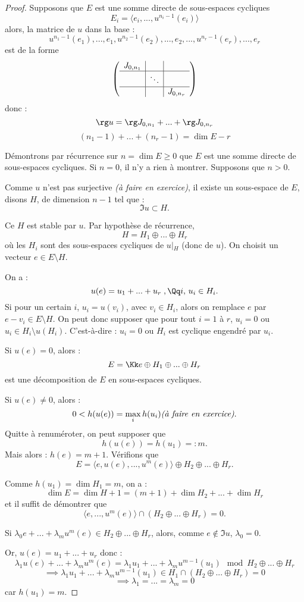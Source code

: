 \documentclass[class=report,crop=false]{standalone}
\newcommand{\exoo}{\emph{(à faire en exercice)}}
\newcommand{\Res}[1]{{\left | {}_{#1} \right.}}
\begin{document}
\begin{proof}
Supposons que $E$ est une somme directe de sous-espaces cycliques 
\[E_i = \langle e_i,...,u^{n_i-1}(e_i)\rangle\]
alors, la matrice de $u$ dans la base :
\[u^{n_1-1}(e_1),...,e_1,u^{n_2-1}(e_2),...,e_2,...,u^{n_r-1}(e_r),...,e_r\]
est de la forme 
\[\left(\begin{array}{c|c|c}
J_{0,n_1}&&\\\hline
&\ddots&\\\hline
&&J_{0,n_r}
\end{array}\right)\]
donc :
\[\rg u = \rg J_{0,n_1} + ... + \rg J_{0,n_r} \]
\[ (n_1 -1) + ... + (n_r -1) = \dim E -r
\]

Démontrons par récurrence sur $n = \dim E \ge 0$ que $E$ est une somme directe de sous-espaces cycliques.
Si $ n = 0$, il n'y a rien à montrer. Supposons que $n >0$.

Comme $u$ n'est pas surjective \exoo, il existe un sous-espace de $E$, disons $H$, de dimension $n-1$ tel que :
\[\Im u \subset H .\]

Ce $H$ est stable par $u$. Par hypothèse de récurrence,
\[H = H_1 \oplus ... \oplus H_r\]
où les $H_i$ sont des sous-espaces cycliques de $u\Res{H}$ (donc de $u$). On choisit un vecteur $e \in E \setminus H$.

On a :
\[u(e) = u_1 +...+u_r \; , \Qq i,\, u_i \in H_i .\]
Si pour un certain $i$, $u_i = u(v_i)$, avec $v_i \in H_i$, alors on remplace $e$ par $e-v_i \in E \setminus H$. On peut donc supposer que pour tout $i = 1$ à $r$, $u_i = 0$ ou $u_i \in H_i \setminus u(H_i)$. C'est-à-dire : $u_i = 0$ ou $H_i$ est cyclique engendré par $u_i$.
 

Si $u(e) = 0$, alors :
\[E = \Kk e \oplus H_1 \oplus ... \oplus H_r\]
est une décomposition de $E$ en sous-espaces cycliques.

Si $u(e) \neq 0$, alors :
\[0 < h(u(e)) = \max_{i}h(u_i) \exoo .\]
Quitte à renuméroter, on peut supposer que \[h(u(e)) = h(u_1) = : m.\]
Mais alors : $h(e) = m+1$. Vérifions que 
\[E = \langle e,u(e) ,...,u^{m}(e)\rangle \oplus H_2 \oplus ... \oplus H_r .\]

Comme $h(u_1) = \dim H_1 = m $, on a : 
\[\dim E = \dim H + 1 = (m+1) + \dim H_2 + ... + \dim H_r\]
et il suffit de démontrer que 
\[\langle e, ..., u^{m}(e) \rangle \cap (H_2 \oplus ... \oplus H_r) = 0 .\]

Si $\lambda_0 e + ... + \lambda_m u^m(e) \in H_2 \oplus ... \oplus H_r$, alors, comme $e \not\in \Im u$, $\lambda_0 = 0$.

Or, $u(e) = u_1 + ... +u_r$ donc :
\[\lambda_1u(e) + ... + \lambda_m u^m(e) = \lambda_1 u_1 + ... + \lambda_mu^{m-1}(u_1) \mod H_2 \oplus ... \oplus H_r\]
\[\implies \lambda_1 u_1 + ... + \lambda_mu^{m-1}(u_1) \in H_1 \cap (H_2 \oplus ... \oplus H_r) = 0\]
\[\implies \lambda_1 = ... = \lambda_m =0\]
car $h(u_1) = m$. 
\end{proof}
\end{document}

